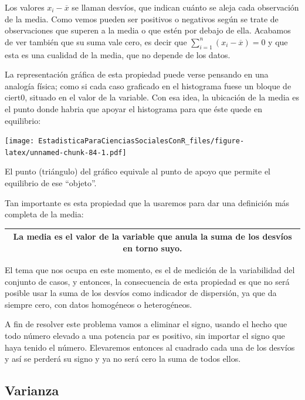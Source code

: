 \documentclass[]{book}
\begin{document}
Los valores \(x_{i} - \overline{x}\) se llaman desvíos, que indican cuánto
se aleja cada observación de la media. Como vemos pueden ser positivos o
negativos según se trate de observaciones que superen a la media o que
estén por debajo de ella. Acabamos de ver también que su suma vale cero,
es decir que \(\sum_{i = 1}^{n}{\left( x_{i} - \overline{x} \right) = 0}\)
y que esta es una cualidad de la media, que no depende de los
datos.

La representación gráfica de esta propiedad puede verse pensando en una analogía física; como si cada caso graficado en el histograma fuese un bloque de ciert0, situado en el valor de la variable. Con esa idea, la ubicación de la media es el punto donde habria que apoyar el histograma para que éste quede en equilibrio:

\texttt{[image: EstadisticaParaCienciasSocialesConR\_files/figure-latex/unnamed-chunk-84-1.pdf]}

El punto (triángulo) del gráfico equivale al punto de apoyo que permite el equilibrio de ese ``objeto''.

Tan importante es esta propiedad que la usaremos para dar
una definición más completa de la media:

\begin{longtable}[]{@{}c@{}}
\toprule
\endhead
\begin{minipage}[t]{0.97\columnwidth}\centering
La \textbf{media} es el valor de la variable que anula la suma de los desvíos en torno suyo.\strut
\end{minipage}\tabularnewline
\bottomrule
\end{longtable}

El tema que nos ocupa en este momento, es el de medición de la
variabilidad del conjunto de casos, y entonces, la consecuencia de esta propiedad es que no será posible usar la suma de los desvíos como indicador de dispersión, ya que da siempre cero, con datos homogéneos o heterogéneos.

A fin de resolver este problema vamos a eliminar el signo, usando el
hecho que todo número elevado a una potencia par es positivo, sin
importar el signo que haya tenido el número. Elevaremos entonces al
cuadrado cada una de los desvíos y así se perderá su signo y ya no será cero la suma de todos ellos.

\hypertarget{varianza}{%
\subsection{Varianza}\label{varianza}}
\end{document}
